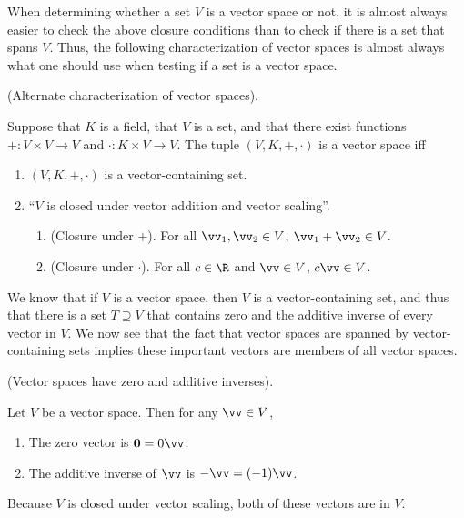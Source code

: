 When determining whether a set $V$ is a vector space or not, it is almost always easier to check the above closure conditions than to check if there is a set that spans $V$. Thus, the following characterization of vector spaces is almost always what one should use when testing if a set is a vector space.

\begin{theorem}
\label{ch::lin_alg::thm::vector_space_alt_characterization}
    (Alternate characterization of vector spaces).
    
    Suppose that $K$ is a field, that $V$ is a set, and that there exist functions $+:V \times V \rightarrow V$ and $\cdot:K \times V \rightarrow V$. The tuple $(V, K, +, \cdot)$ is a vector space iff
    
    \begin{enumerate}
        \item $(V, K, +, \cdot)$ is a vector-containing set.
        \item ``$V$ is closed under vector addition and vector scaling''.
        \begin{enumerate}
            \item[2.1.] (Closure under $+$). For all $\vv_1, \vv_2 \in V$, $\vv_1 + \vv_2 \in V$.
            \item[2.2.] (Closure under $\cdot$). For all $c \in \R$ and $\vv \in V$, $c \vv \in V$.
        \end{enumerate}
    \end{enumerate}
\end{theorem}

We know that if $V$ is a vector space, then $V$ is a vector-containing set, and thus that there is a set $T \supseteq V$ that contains zero and the additive inverse of every vector in $V$. We now see that the fact that vector spaces are spanned by vector-containing sets implies these important vectors are members of all vector spaces.

\begin{theorem}
    (Vector spaces have zero and additive inverses).

    Let $V$ be a vector space. Then for any $\vv \in V$,
    
    \begin{enumerate}
        \item The zero vector is $\mathbf{0} = 0\vv$.
        \item The additive inverse of $\vv$ is $-\vv = (-1)\vv$.
    \end{enumerate}

    Because $V$ is closed under vector scaling, both of these vectors are in $V$.
\end{theorem}

